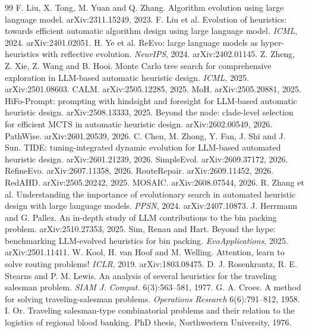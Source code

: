 \documentclass[10pt,twocolumn]{article}
\begin{document}
\begin{thebibliography}{99}
\setlength{\itemsep}{1pt}\small
{} F. Liu, X. Tong, M. Yuan and Q. Zhang. Algorithm evolution using large language model. arXiv:2311.15249, 2023.
 F. Liu et al. Evolution of heuristics: towards efficient automatic algorithm design using large language model. \emph{ICML}, 2024. arXiv:2401.02051.
 H. Ye et al. ReEvo: large language models as hyper-heuristics with reflective evolution. \emph{NeurIPS}, 2024. arXiv:2402.01145.
 Z. Zheng, Z. Xie, Z. Wang and B. Hooi. Monte Carlo tree search for comprehensive exploration in LLM-based automatic heuristic design. \emph{ICML}, 2025. arXiv:2501.08603.
 CALM. arXiv:2505.12285, 2025.
 MoH. arXiv:2505.20881, 2025.
 HiFo-Prompt: prompting with hindsight and foresight for LLM-based automatic heuristic design. arXiv:2508.13333, 2025.
 Beyond the node: clade-level selection for efficient MCTS in automatic heuristic design. arXiv:2602.00549, 2026.
 PathWise. arXiv:2601.20539, 2026.
 C. Chen, M. Zhong, Y. Fan, J. Shi and J. Sun. TIDE: tuning-integrated dynamic evolution for LLM-based automated heuristic design. arXiv:2601.21239, 2026.
 SimpleEvol. arXiv:2609.37172, 2026.
 RefineEvo. arXiv:2607.11358, 2026.
 RouteRepair. arXiv:2609.11452, 2026.
 RedAHD. arXiv:2505.20242, 2025.
 MOSAIC. arXiv:2608.07544, 2026.
 R. Zhang et al. Understanding the importance of evolutionary search in automated heuristic design with large language models. \emph{PPSN}, 2024. arXiv:2407.10873.
 J. Herrmann and G. Pallez. An in-depth study of LLM contributions to the bin packing problem. arXiv:2510.27353, 2025.
 Sim, Renau and Hart. Beyond the hype: benchmarking LLM-evolved heuristics for bin packing. \emph{EvoApplications}, 2025. arXiv:2501.11411.
 W. Kool, H. van Hoof and M. Welling. Attention, learn to solve routing problems! \emph{ICLR}, 2019. arXiv:1803.08475.
 D. J. Rosenkrantz, R. E. Stearns and P. M. Lewis. An analysis of several heuristics for the traveling salesman problem. \emph{SIAM J. Comput.} 6(3):563--581, 1977.
 G. A. Croes. A method for solving traveling-salesman problems. \emph{Operations Research} 6(6):791--812, 1958.
 I. Or. Traveling salesman-type combinatorial problems and their relation to the logistics of regional blood banking. PhD thesis, Northwestern University, 1976.

\end{thebibliography}
\end{document}
